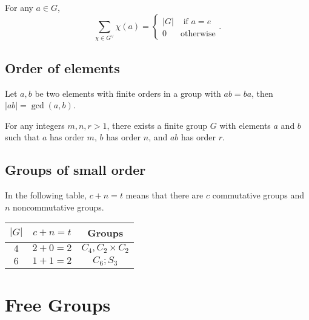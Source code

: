 \begin{corollary}
  \label{corollary-orthogonality-relation}
  For any \( a \in G \),
  \[
    \sum_{\chi \in G^{\vee}} \chi(a) = \begin{cases}
      \left\vert G \right\vert & \text{ if } a = e\\
      0 &\text{otherwise}
    \end{cases}.
  \]
\end{corollary}

\subsection{Order of elements}
\label{subsection-order-of-elements}

\begin{proposition}
  \label{proposition-order-of-commutative-ab}
  Let \( a, b \) be two elements with finite orders in a group with \( ab = ba \), then \( \left\lvert ab \right\rvert = \gcd(a, b) \).
\end{proposition}

\begin{theorem}
  \label{theorem-general-order-of-ab}
  For any integers \( m, n, r > 1 \), there exists a finite group \( G \) with elements \( a \) and \( b \) such that \( a \) has order \( m \), \( b \) has order \( n \), and \( ab \) has order \( r \).
\end{theorem}

\subsection{Groups of small order}
\label{subsection-groups-of-small-order}

In the following table, \( c + n = t \) means that there are \( c \) commutative groups and \( n \) noncommutative groups.
\begin{table}[H]
  \centering
  \begin{tabular}{c|c|c}
    \hline
    \( \left\vert G \right\vert \) & \( c + n = t \) & Groups\\
    \hline
    \( 4 \) & \( 2 + 0 = 2 \) & \( C_4, C_2 \times C_2 \)\\
    \( 6 \) & \( 1 + 1 = 2 \) & \( C_6; S_3 \)\\
    \hline
  \end{tabular}
\end{table}

\section{Free Groups}
\label{section-free-groups}


